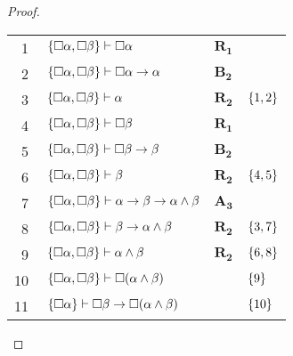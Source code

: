 \begin{tcolorbox}[enhanced jigsaw, breakable, sharp corners, colframe=black, colback=white, boxrule=0.5pt, left=1.5mm, right=1.5mm, top=1.5mm, bottom=1.5mm]
\begin{lemma}
\begin{proof}
        \vspace{0.5\baselineskip}
        \footnotesize
        \setlength{\rowskip}{0.5\baselineskip}
        \begin{xltabular}{\textwidth}{r | X l l}
            \scriptsize{\phantom{0}1}\phantom{ } & $\ \set{\nec\alpha,\nec\beta}\vdash\nec\alpha$                         & $\hyperref[modal.rule.1]{\mathbf{R_1}}$        & \\[\rowskip]
            \scriptsize{\phantom{0}2}\phantom{ } & $\ \set{\nec\alpha,\nec\beta}\vdash\nec\alpha\to\alpha$                & $\hyperref[modal.axiom.modal.2]{\mathbf{B_2}}$ & \\[\rowskip]
            \scriptsize{\phantom{0}3}\phantom{ } & $\ \set{\nec\alpha,\nec\beta}\vdash\alpha$                             & $\hyperref[modal.rule.2]{\mathbf{R_2}}$        & $\left\{1,2\right\}$\\[\rowskip]
            \scriptsize{\phantom{0}4}\phantom{ } & $\ \set{\nec\alpha,\nec\beta}\vdash\nec\beta$                          & $\hyperref[modal.rule.1]{\mathbf{R_1}}$        & \\[\rowskip]
            \scriptsize{\phantom{0}5}\phantom{ } & $\ \set{\nec\alpha,\nec\beta}\vdash\nec\beta\to\beta$                  & $\hyperref[modal.axiom.modal.2]{\mathbf{B_2}}$ & \\[\rowskip]
            \scriptsize{\phantom{0}6}\phantom{ } & $\ \set{\nec\alpha,\nec\beta}\vdash\beta$                              & $\hyperref[modal.rule.2]{\mathbf{R_2}}$        & $\left\{4,5\right\}$\\[\rowskip]
            \scriptsize{\phantom{0}7}\phantom{ } & $\ \set{\nec\alpha,\nec\beta}\vdash\alpha\to\beta\to\alpha\wedge\beta$ & $\hyperref[modal.axiom.3]{\mathbf{A_3}}$       & \\[\rowskip]
            \scriptsize{\phantom{0}8}\phantom{ } & $\ \set{\nec\alpha,\nec\beta}\vdash\beta\to\alpha\wedge\beta$          & $\hyperref[modal.rule.2]{\mathbf{R_2}}$        & $\left\{3,7\right\}$\\[\rowskip]
            \scriptsize{\phantom{0}9}\phantom{ } & $\ \set{\nec\alpha,\nec\beta}\vdash\alpha\wedge\beta$                  & $\hyperref[modal.rule.2]{\mathbf{R_2}}$        & $\left\{6,8\right\}$\\[\rowskip]
            \scriptsize{10}\phantom{ }           & $\ \set{\nec\alpha,\nec\beta}\vdash\nec(\alpha\wedge\beta)$            & \phantom{1}           & $\left\{9\right\}$\\[\rowskip]
            \scriptsize{11}\phantom{ }           & $\ \set{\nec\alpha}\vdash\nec\beta\to\nec(\alpha\wedge\beta)$          &                            & $\left\{10\right\}$\\[\rowskip]

\end{xltabular}
\end{proof}
\end{lemma}
\end{tcolorbox}
